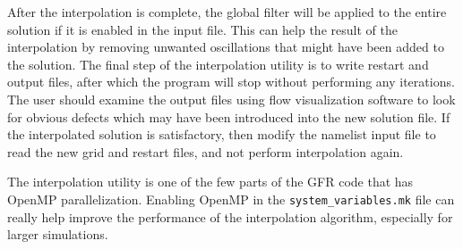 After the interpolation is complete, the global filter will be applied to the
entire solution if it is enabled in the input file.
%
This can help  the result of the interpolation by removing
unwanted oscillations that might have been added to the solution.
%
The final step of the interpolation utility is to write restart and output
files, after which the program will stop without performing
any iterations.
%
The user should examine the output files using flow visualization
software to look for obvious defects which may have been introduced
into the new solution file.
%
If the interpolated solution is satisfactory, then modify the namelist input file to read
the new grid and restart files, and not perform interpolation again.
%


The interpolation utility is one of the few parts of the GFR code that has
OpenMP parallelization.
%
Enabling OpenMP in the \texttt{system\_variables.mk} file can really help improve
the performance of the interpolation algorithm, especially for larger
simulations.






